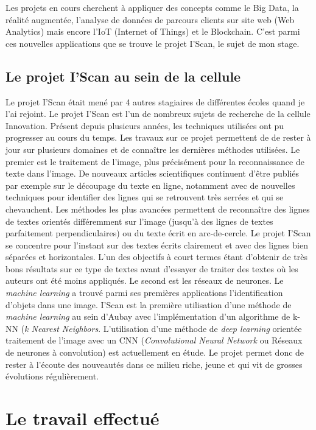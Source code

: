 \documentclass[12pt,a4paper]{article}
\begin{document}
Les projets en cours cherchent à appliquer des concepts comme le Big Data, la réalité augmentée, l’analyse de données de parcours clients sur site web (Web Analytics) mais encore l’IoT (Internet of Things) et le Blockchain. \bigbreak
C’est parmi ces nouvelles applications que se trouve le projet I’Scan, le sujet de mon stage.

\subsection{Le projet I'Scan au sein de la cellule}
Le projet I’Scan était mené par 4 autres stagiaires de différentes écoles quand je l’ai rejoint.\bigbreak
Le projet I’Scan est l’un de nombreux sujets de recherche de la cellule Innovation. Présent depuis plusieurs années, les techniques utilisées ont pu progresser au cours du temps. Les travaux sur ce projet permettent de de rester à jour sur plusieurs domaines et de connaître les dernières méthodes utilisées.\bigbreak
Le premier est le traitement de l’image, plus précisément pour la reconnaissance de texte dans l’image. De nouveaux articles scientifiques continuent d’être publiés par exemple sur le découpage du texte en ligne, notamment avec de nouvelles techniques pour identifier des lignes qui se retrouvent très serrées et qui se chevauchent. Les méthodes les plus avancées permettent de reconnaître des lignes de textes orientés différemment sur l’image (jusqu’à des lignes de textes parfaitement perpendiculaires) ou du texte écrit en arc-de-cercle. Le projet I’Scan se concentre pour l’instant sur des textes écrits clairement et avec des lignes bien séparées et horizontales. L’un des objectifs à court termes étant d’obtenir de très bons résultats sur ce type de textes avant d’essayer de traiter des textes où les auteurs ont été moins appliqués.\bigbreak
Le second est les réseaux de neurones. Le \textit{machine learning} a trouvé parmi ses premières applications l’identification d’objets dans une image. I’Scan est la première utilisation d’une méthode de \textit{machine learning} au sein d’Aubay avec l'implémentation d'un algorithme de k-NN (\textit{k Nearest Neighbors}. L'utilisation d'une méthode de \textit{deep learning} orientée traitement de l'image avec un CNN (\textit{Convolutional Neural Network} ou Réseaux de neurones à convolution) est actuellement en étude. Le projet permet donc de rester à l’écoute des nouveautés dans ce milieu riche, jeune et qui vit de grosses évolutions régulièrement.

\newpage
\section{Le travail effectué}
\end{document}
